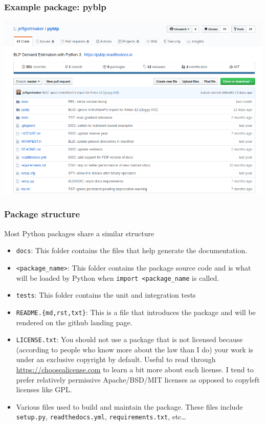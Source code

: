 \documentclass[10pt]{beamer}
\begin{document}
  \begin{frame} \frametitle{Example package: pyblp}

    \begin{center}
      \includegraphics[width=\textwidth]{pyblp_gh_snapshot.png}
    \end{center}


  \end{frame}

  \begin{frame} \frametitle{Package structure}

    {\footnotesize
    Most Python packages share a similar structure

    \begin{itemize}
      \item \texttt{docs}: This folder contains the files that help generate the documentation.
      \item \texttt{<package\_name>}: This folder contains the package source code and is what will
        be loaded by Python when \texttt{import <package\_name} is called.
      \item \texttt{tests}: This folder contains the unit and integration tests
      \item \texttt{README.\{md,rst,txt\}}: This is a file that introduces the package and will be
        rendered on the github landing page.
      \item \texttt{LICENSE.txt}: You should not use a package that is not licensed because
        (according to people who know more about the law than I do) your work is under an
        exclusive copyright by default. Useful to read through \url{https://choosealicense.com}
        to learn a bit more about each license. I tend to prefer relatively permissive Apache/BSD/MIT
        licenses as opposed to copyleft licenses like GPL.
      \item Various files used to build and maintain the package. These files include
        \texttt{setup.py}, \texttt{readthedocs.yml}, \texttt{requirements.txt}, etc\dots
    \end{itemize}

    }

  \end{frame}
\end{document}
